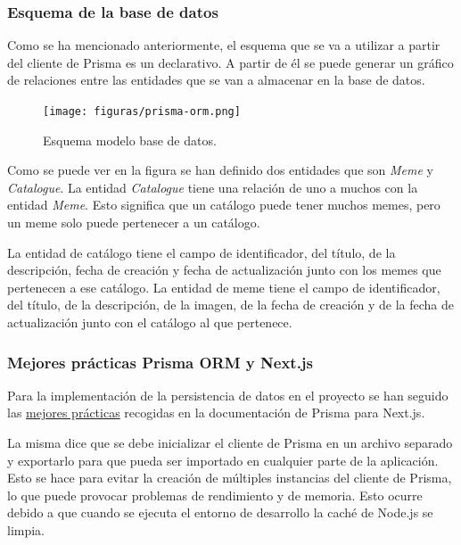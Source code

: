 \subsubsection{Esquema de la base de datos}

Como se ha mencionado anteriormente, el esquema que se va a utilizar a partir del cliente de Prisma es un declarativo. A partir de él se puede generar un gráfico de relaciones entre las entidades que se van a almacenar en la base de datos.

\begin{figure}[H]
    \caption{Esquema modelo base de datos.}
    \centering
    \vspace*{0.5cm}
    \texttt{[image: figuras/prisma-orm.png]}
\end{figure}

Como se puede ver en la figura se han definido dos entidades que son \textit{Meme} y \textit{Catalogue}. La entidad \textit{Catalogue} tiene una relación de uno a muchos con la entidad \textit{Meme}. Esto significa que un catálogo puede tener muchos memes, pero un meme solo puede pertenecer a un catálogo.

La entidad de catálogo tiene el campo de identificador, del título, de la descripción, fecha de creación y fecha de actualización junto con los memes que pertenecen a ese catálogo. La entidad de meme tiene el campo de identificador, del título, de la descripción, de la imagen, de la fecha de creación y de la fecha de actualización junto con el catálogo al que pertenece.

\subsubsection{Mejores prácticas Prisma ORM y Next.js}

Para la implementación de la persistencia de datos en el proyecto se han seguido las \href{https://www.prisma.io/docs/orm/more/help-and-troubleshooting/help-articles/nextjs-prisma-client-dev-practices}{mejores prácticas} recogidas en la documentación de Prisma para Next.js.

La misma dice que se debe inicializar el cliente de Prisma en un archivo separado y exportarlo para que pueda ser importado en cualquier parte de la aplicación. Esto se hace para evitar la creación de múltiples instancias del cliente de Prisma, lo que puede provocar problemas de rendimiento y de memoria. Esto ocurre debido a que cuando se ejecuta el entorno de desarrollo la caché de Node.js se limpia.

